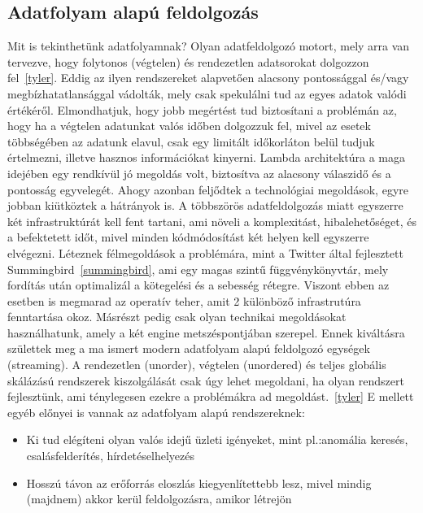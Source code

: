 \documentclass[a4paper,12pt]{article}
\begin{document}
\subsection{Adatfolyam alapú feldolgozás}
Mit is tekinthetünk adatfolyamnak? Olyan adatfeldolgozó motort, mely arra van tervezve, hogy folytonos (végtelen) és rendezetlen adatsorokat dolgozzon fel~\ref{tyler}. Eddig az ilyen rendszereket alapvetően alacsony pontossággal és/vagy megbízhatatlansággal vádolták, mely csak spekulálni tud az egyes adatok valódi értékéről. Elmondhatjuk, hogy jobb megértést tud biztosítani a problémán az, hogy ha a végtelen adatunkat valós időben dolgozzuk fel, mivel az esetek többségében az adatunk elavul, csak egy limitált időkorláton belül tudjuk értelmezni, illetve hasznos információkat kinyerni. \linebreak
Lambda architektúra a maga idejében egy rendkívül jó megoldás volt, biztosítva az alacsony válaszidő és a pontosság egyvelegét. Ahogy azonban feljődtek a technológiai megoldások, egyre jobban kiütköztek a hátrányok is. A többszörös adatfeldolgozás miatt egyszerre két infrastruktúrát kell fent tartani, ami növeli a komplexitást, hibalehetőséget, és a befektetett időt, mivel minden kódmódosítást két helyen kell egyszerre elvégezni. Léteznek félmegoldások a problémára, mint a Twitter által fejlesztett Summingbird~\ref{summingbird}, ami egy magas szintű függvénykönyvtár, mely fordítás után optimalizál a kötegelési és a sebesség rétegre. Viszont ebben az esetben is megmarad az operatív teher, amit 2 különböző infrastrutúra fenntartása okoz. Másrészt pedig csak olyan technikai megoldásokat használhatunk, amely a két engine metszéspontjában szerepel. \linebreak
Ennek kiváltásra születtek meg a ma ismert modern adatfolyam alapú feldolgozó egységek (streaming). A rendezetlen (unorder), végtelen (unordered) és teljes globális skálázású rendszerek kiszolgálását csak úgy lehet megoldani, ha olyan rendszert fejlesztünk, ami ténylegesen ezekre a problémákra ad megoldást.~\ref{tyler} E mellett egyéb előnyei is vannak az adatfolyam alapú rendszereknek: 
\begin{itemize}
\item Ki tud elégíteni olyan valós idejű üzleti igényeket, mint pl.:anomália keresés, csalásfelderítés, hírdetéselhelyezés
\item Hosszú távon az erőforrás eloszlás kiegyenlítettebb lesz, mivel mindig (majdnem) akkor kerül feldolgozásra, amikor létrejön
\end{itemize}
\end{document}
